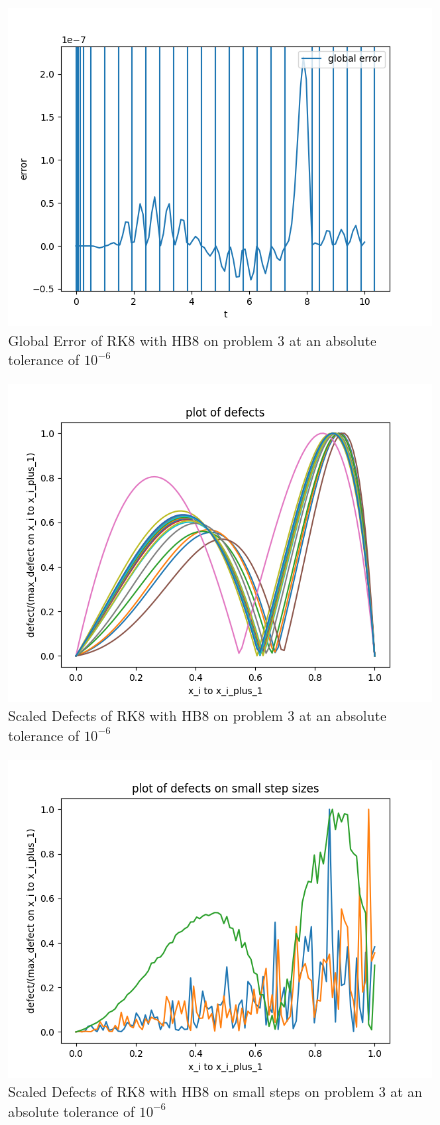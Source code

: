 \documentclass{article}
\begin{document}
\begin{figure}[H]
\centering
\includegraphics[width=0.7\linewidth]{./figures/rk8_with_hb8_p3_global_error}
\caption{Global Error of RK8 with HB8 on problem 3 at an absolute tolerance of $10^{-6}$}
\label{fig:rk8_with_hb8_p3_global_error}
\end{figure}

\begin{figure}[H]
\centering
\includegraphics[width=0.7\linewidth]{./figures/rk8_with_hb8_p3_scaled_defects}
\caption{Scaled Defects of RK8 with HB8 on problem 3 at an absolute tolerance of $10^{-6}$}
\label{fig:rk8_with_hb8_p3_scaled_defects}
\end{figure}

\begin{figure}[H]
\centering
\includegraphics[width=0.7\linewidth]{./figures/rk8_with_hb8_p3_scaled_defects_small_steps}
\caption{Scaled Defects of RK8 with HB8 on small steps on problem 3 at an absolute tolerance of $10^{-6}$}
\label{fig:rk8_with_hb8_p3_scaled_defects_small_steps}
\end{figure}
\end{document}
